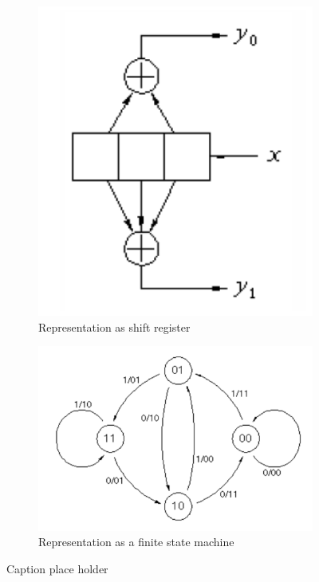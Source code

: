 \documentclass[12pt]{article}   	%
\begin{document}
\begin{figure}[htb]
    \centering
    \begin{subfigure}[t]{0.5\textwidth}
        \centering
        \includegraphics[height=0.7\textwidth]{img/conv_code_sh_reg}
        \caption{Representation as shift register}
        \label{fig:conv_code_sh_reg}
    \end{subfigure}%
    \begin{subfigure}[t]{0.5\textwidth}
        \centering
        \includegraphics[height=0.7\textwidth]{img/conv_code_fsm}
        \caption{Representation as a finite state machine}
        \label{fig:conv_code_fsm}
    \end{subfigure}
    \caption{Caption place holder}
    \label{fig:conv_code_reps}
\end{figure}
\end{document}
